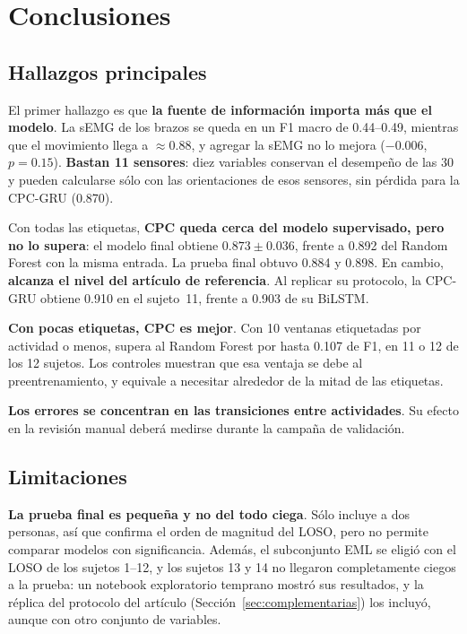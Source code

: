 \documentclass[letterpaper,11pt]{article}
\begin{document}
\section{Conclusiones}

\subsection{Hallazgos principales}

El primer hallazgo es que \textbf{la fuente de información importa más que el modelo}. La sEMG de los brazos se queda en un F1 macro de 0.44--0.49, mientras que el movimiento llega a $\approx 0.88$, y agregar la sEMG no lo mejora ($-0.006$, $p = 0.15$). \textbf{Bastan 11 sensores}: diez variables conservan el desempeño de las 30 y pueden calcularse sólo con las orientaciones de esos sensores, sin pérdida para la CPC-GRU (0.870).

Con todas las etiquetas, \textbf{CPC queda cerca del modelo supervisado, pero no lo supera}: el modelo final obtiene $0.873 \pm 0.036$, frente a 0.892 del Random Forest con la misma entrada. La prueba final obtuvo 0.884 y 0.898. En cambio, \textbf{alcanza el nivel del artículo de referencia}. Al replicar su protocolo, la CPC-GRU obtiene 0.910 en el sujeto~11, frente a 0.903 de su BiLSTM.

\textbf{Con pocas etiquetas, CPC es mejor}. Con 10 ventanas etiquetadas por actividad o menos, supera al Random Forest por hasta 0.107 de F1, en 11 o 12 de los 12 sujetos. Los controles muestran que esa ventaja se debe al preentrenamiento, y equivale a necesitar alrededor de la mitad de las etiquetas.

\textbf{Los errores se concentran en las transiciones entre actividades}. Su efecto en la revisión manual deberá medirse durante la campaña de validación.

\subsection{Limitaciones}
\textbf{La prueba final es pequeña y no del todo ciega}. Sólo incluye a dos personas, así que confirma el orden de magnitud del LOSO, pero no permite comparar modelos con significancia. Además, el subconjunto EML se eligió con el LOSO de los sujetos 1--12, y los sujetos 13 y 14 no llegaron completamente ciegos a la prueba: un notebook exploratorio temprano mostró sus resultados, y la réplica del protocolo del artículo (Sección~\ref{sec:complementarias}) los incluyó, aunque con otro conjunto de variables.
\end{document}
